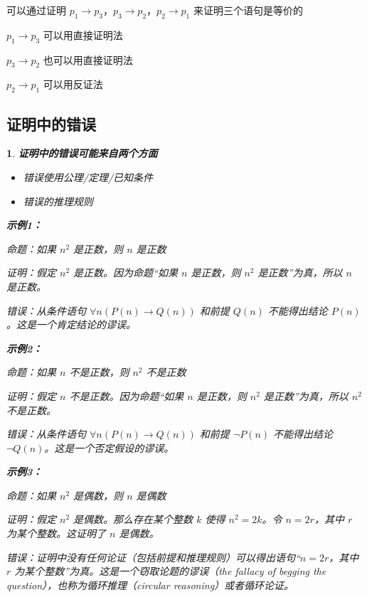 \documentclass[UTF8]{report}
\theoremstyle{MyLineTheoremStyle} %
\theoremstyle{MyBlockTheoremStyle} %
\theoremstyle{MySubsubsectionStyle} %
\newtheorem{definition}{}
\begin{document}
可以通过证明 $p_1 \rightarrow p_3$，$p_3 \rightarrow p_2$，$p_2 \rightarrow p_1$ 来证明三个语句是等价的\par
$p_1 \rightarrow p_3$ 可以用直接证明法\par
$p_3 \rightarrow p_2$ 也可以用直接证明法\par
$p_2 \rightarrow p_1$ 可以用反证法\par

\subsection{证明中的错误}

\begin{definition}
    \textbf{证明中的错误可能来自两个方面}\par
    \begin{itemize}
        \item 错误使用公理/定理/已知条件
        \item 错误的推理规则
    \end{itemize}

    \textbf{示例1：}\par
    命题：如果 $n^2$ 是正数，则 $n$ 是正数\par
    证明：假定 $n^2$ 是正数。因为命题“如果 $n$ 是正数，则 $n^2$ 是正数”为真，所以 $n$ 是正数。\par
    错误：从条件语句 $\forall n (P(n) \rightarrow Q(n))$ 和前提 $Q(n)$ 不能得出结论 $P(n)$。这是一个肯定结论的谬误。\par

    \textbf{示例2：}\par
    命题：如果 $n$ 不是正数，则 $n^2$ 不是正数\par
    证明：假定 $n$ 不是正数。因为命题“如果 $n$ 是正数，则 $n^2$ 是正数”为真，所以 $n^2$ 不是正数。\par
    错误：从条件语句 $\forall n (P(n) \rightarrow Q(n))$ 和前提 $\neg P(n)$ 不能得出结论 $\neg Q(n)$。这是一个否定假设的谬误。\par

    \textbf{示例3：}\par
    命题：如果 $n^2$ 是偶数，则 $n$ 是偶数\par
    证明：假定 $n^2$ 是偶数。那么存在某个整数 $k$ 使得 $n^2 = 2k$。令 $n = 2r$，其中 $r$ 为某个整数。这证明了 $n$ 是偶数。\par
    错误：证明中没有任何论证（包括前提和推理规则）可以得出语句“$n = 2r$，其中 $r$ 为某个整数”为真。这是一个窃取论题的谬误（the fallacy of begging the question），也称为循环推理（circular reasoning）或者循环论证。\par
\end{definition}
\end{document}
